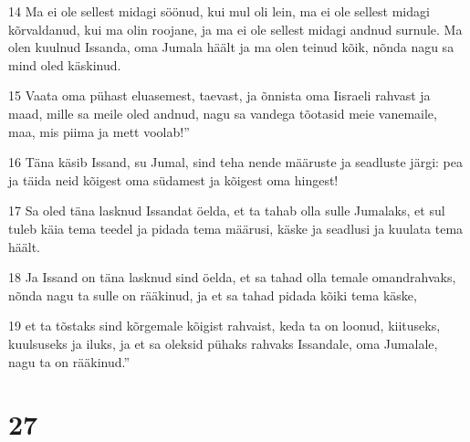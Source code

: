 \par 14 Ma ei ole sellest midagi söönud, kui mul oli lein, ma ei ole sellest midagi kõrvaldanud, kui ma olin roojane, ja ma ei ole sellest midagi andnud surnule. Ma olen kuulnud Issanda, oma Jumala häält ja ma olen teinud kõik, nõnda nagu sa mind oled käskinud.
\par 15 Vaata oma pühast eluasemest, taevast, ja õnnista oma Iisraeli rahvast ja maad, mille sa meile oled andnud, nagu sa vandega tõotasid meie vanemaile, maa, mis piima ja mett voolab!”
\par 16 Täna käsib Issand, su Jumal, sind teha nende määruste ja seadluste järgi: pea ja täida neid kõigest oma südamest ja kõigest oma hingest!
\par 17 Sa oled täna lasknud Issandat öelda, et ta tahab olla sulle Jumalaks, et sul tuleb käia tema teedel ja pidada tema määrusi, käske ja seadlusi ja kuulata tema häält.
\par 18 Ja Issand on täna lasknud sind öelda, et sa tahad olla temale omandrahvaks, nõnda nagu ta sulle on rääkinud, ja et sa tahad pidada kõiki tema käske,
\par 19 et ta tõstaks sind kõrgemale kõigist rahvaist, keda ta on loonud, kiituseks, kuulsuseks ja iluks, ja et sa oleksid pühaks rahvaks Issandale, oma Jumalale, nagu ta on rääkinud.”

\chapter{27}

